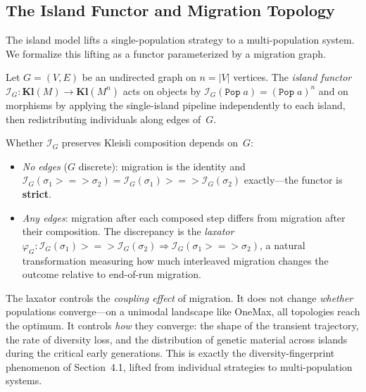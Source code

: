 

\subsection{The Island Functor and Migration Topology}
\label{sec:island-functor}

The island model lifts a single-population strategy to a
multi-population system.  We formalize this lifting as a functor
parameterized by a migration graph.

Let $G = (V, E)$ be an undirected graph on $n = |V|$ vertices.  The
\emph{island functor}
$\mathcal{I}_G : \mathbf{Kl}(M) \to \mathbf{Kl}(M^n)$
acts on objects by
$\mathcal{I}_G(\texttt{Pop}\;a) = (\texttt{Pop}\;a)^n$
and on morphisms by applying the single-island pipeline independently
to each island, then redistributing individuals along edges of~$G$.

Whether $\mathcal{I}_G$ preserves Kleisli composition depends on~$G$:
\begin{itemize}[nosep]
  \item \emph{No edges} ($G$ discrete): migration is the identity and
    $\mathcal{I}_G(\sigma_1 \mathbin{>\!\!=\!\!>} \sigma_2) =
     \mathcal{I}_G(\sigma_1) \mathbin{>\!\!=\!\!>} \mathcal{I}_G(\sigma_2)$
    exactly---the functor is \textbf{strict}.
  \item \emph{Any edges}: migration after each composed step differs
    from migration after their composition.  The discrepancy is the
    \emph{laxator}
    $\varphi_G : \mathcal{I}_G(\sigma_1) \mathbin{>\!\!=\!\!>}
     \mathcal{I}_G(\sigma_2) \Rightarrow
     \mathcal{I}_G(\sigma_1 \mathbin{>\!\!=\!\!>} \sigma_2)$,
    a natural transformation measuring how much interleaved migration
    changes the outcome relative to end-of-run migration.
\end{itemize}

\noindent The laxator controls the \emph{coupling effect} of migration.
It does not change \emph{whether} populations converge---on a unimodal
landscape like OneMax, all topologies reach the optimum.  It controls
\emph{how} they converge: the shape of the transient trajectory, the
rate of diversity loss, and the distribution of genetic material across
islands during the critical early generations.  This is exactly the
diversity-fingerprint phenomenon of Section~4.1, lifted from individual
strategies to multi-population systems.

